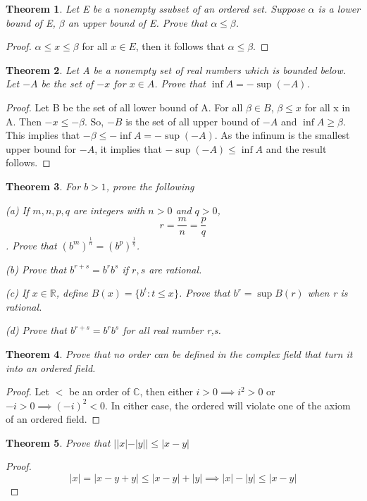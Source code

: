 \documentclass{article}
\theoremstyle{plain}
\newtheorem{theorem}{Theorem}
\theoremstyle{definition}
\begin{document}
\begin{theorem}
	Let E be a nonempty ssubset of an ordered set. Suppose $\alpha$ is a lower bound of E, $\beta$ an upper bound of E. Prove that $\alpha \leq \beta$.
\end{theorem}

\begin{proof}
	$\alpha \leq x \leq \beta$ for all $x \in E$, then it follows that $\alpha \leq \beta$.
\end{proof}

\begin{theorem}
	Let A be a nonempty set of real numbers which is bounded below. Let $-A$ be the set of $-x$ for $x \in A$. Prove that $\inf A = -\sup(-A)$.
\end{theorem}

\begin{proof}
	Let B be the set of all lower bound of A. For all $\beta \in B$, $\beta \leq x$ for all x in A. Then $-x \leq -\beta$. So, $-B$ is the set of all upper bound of $-A$ and $\inf A \geq \beta$. This implies that $-\beta \leq - \inf A = - \sup(-A)$. As the infinum is the smallest upper bound for $-A$, it implies that $- \sup(-A) \leq \inf A$ and the result follows.
\end{proof}

\begin{theorem}
	For $b > 1$, prove the following

	(a) If $m,n,p,q$ are integers with $n >0$ and $q > 0$, $$r = \frac{m}{n} = \frac{p}{q} $$. Prove that $(b^{m})^{\frac{1}{n}} = (b^{p})^{\frac{1}{q}}$.

	(b) Prove that $b^{r + s} = b^{r}b^{s}$ if $r,s$ are rational.

	(c) If $x \in \mathbb{R}$, define $B(x) = \{ b^{t}: t \leq x \}$. Prove that $b^{r} = \sup B(r)$ when r is rational.

	(d) Prove that $b^{r + s} = b^{r}b^{s}$ for all real number r,s.
\end{theorem}

\begin{theorem}
	Prove that no order can be defined in the complex field that turn it into an ordered field.
\end{theorem}
\begin{proof}
	Let $<$ be an order of $\mathbb{C}$, then either $i > 0 \implies i^{2} > 0$ or $-i > 0 \implies (-i)^{2} < 0$. In either case, the ordered will violate one of the axiom of an ordered field. 
\end{proof}

\begin{theorem}
	Prove that $||x| - |y|| \leq |x - y|$
\end{theorem}

\begin{proof}
	$$|x| = |x - y + y| \leq |x - y| + |y| \implies |x| - |y| \leq |x - y| $$
\end{proof}
\end{document}
